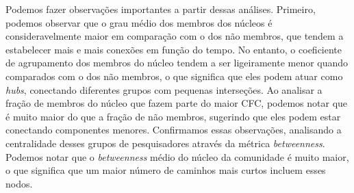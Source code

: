 
Podemos fazer observações importantes a partir dessas análises. Primeiro, podemos observar que o grau médio dos membros 
dos núcleos é consideravelmente maior em comparação com o dos não membros, que tendem a estabelecer mais e mais 
conexões em função do tempo. No entanto, o coeficiente de agrupamento dos membros do núcleo tendem a ser 
ligeiramente menor quando comparados com o dos não membros, o que significa que eles podem atuar como \textit{hubs}, conectando 
diferentes grupos com pequenas interseções. Ao analisar a fração de membros do núcleo que fazem parte do maior 
CFC, podemos notar que é muito maior do que a fração de não membros, sugerindo que eles podem estar conectando componentes 
menores. Confirmamos essas observações, analisando a centralidade desses grupos de pesquisadores através da métrica \textit{betweenness}. 
Podemos notar que o \textit{betweenness} médio do núcleo da comunidade é muito maior, o que significa que um maior número de caminhos mais 
curtos incluem esses nodos.

